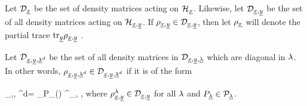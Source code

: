 \documentclass[12pt]{article}
\begin{document}
Let $\cald_\rvx$ be the set of
 density matrices acting on $\calh_\rvx$.
Likewise, let $\cald_{\rvx, \rvy}$
be the set of all density matrices
acting on $\calh_{\rvx, \rvy}$.
If $\rho_{\rvx,\rvy}\in \cald_{\rvx,\rvy}$,
then let $\rho_\rvx$
will denote the partial trace
$\tr_\rvy \rho_{\rvx, \rvy}$ .


Let $\cald_{\rvx, \rvy, \rvlam^d}$
be the set of all
density matrices in
$\cald_{\rvx, \rvy, \rvlam}$
which are diagonal in $\lam$.
In other words, $\rho_{\rvx,\rvy, \rvlam^d}
\in \cald_{\rvx, \rvy, \rvlam^d}$
if it is of the form


\beq
\rho_{\rvx,\rvy, \rvlam^d}=
\sum_\lam P_\rvlam(\lam)\ket{\lam}\bra{\lam}
\rho^\lam_{\rvx, \rvy}
\;,
\eeq
where
 $\rho^\lam_{\rvx, \rvy} \in \cald_{\rvx,\rvy}$
for all $\lam$
and $P_\rvlam\in \calp_\rvlam$.
\end{document}
